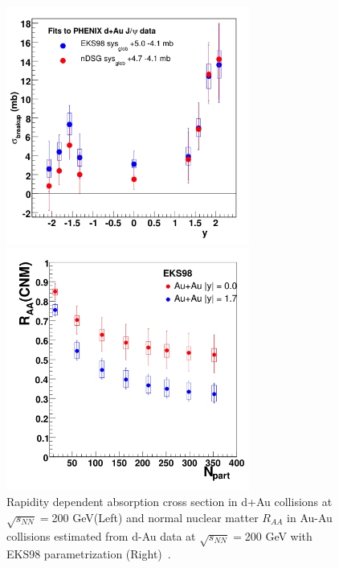 \begin{figure}[!h]
  \begin{minipage}{0.5\hsize}
    \begin{center}
      \includegraphics[width=8cm]{chap2/figure/experimentaldata/phenix_absxsection.png}
    \end{center}
  \end{minipage}
  \begin{minipage}{0.5\hsize}
    \begin{center}
      \includegraphics[width=8cm]{chap2/figure/experimentaldata/phenix_cnmraa.png}
    \end{center}
  \end{minipage}
  \caption{
  	Rapidity dependent absorption cross section in d+Au collisions at $\sqrt{s_{NN}}=$200 GeV(Left) and normal nuclear matter $R_{AA}$ in Au-Au collisions estimated from d-Au data at $\sqrt{s_{NN}}=$200 GeV with EKS98 parametrization (Right)~\cite{bib_daucorr2}. 
  }
  \label{fig_2_cnmraa}
\end{figure}

